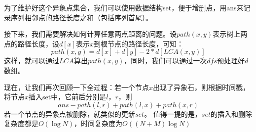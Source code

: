 \documentclass[UTF8]{ctexart}
\begin{document}
	为了维护好这个异象点集合，我们可以使用数据结构set，便于增删点，用ans来记录序列相邻点的路径长度之和（包括序列首尾）。
	
	接下来，我们需要解决如何计算任意两点距离的问题。设$path(x,y)$表示树上两点的路径长度，设$d[x]$表示$x$到根节点的路径长度，可知：
	\begin{equation}
		path(x,y)=d[x]+d[y]-2*d[LCA(x,y)]
	\end{equation}
	这样，就可以通过$LCA$算出$path(x,y)$，同时，我们可以通过一次$dfs$预处理好$d$数组。
	
	现在，让我们再次回顾一下全过程：若一个节点$x$出现了异象石，则根据时间戳，将节点$x$插入set中，它前后分别是$l$，$r$，则
	$$ans-path(l,r)+path(l,x)+path(x,r)$$
	若一个节点的异象点被删除，就类似的更新$set$。
	值得一提的是，$set$的插入和删除复杂度都是$O(\log N)$，时间复杂度为$O((N+M)\log N)$
	
\end{document}
